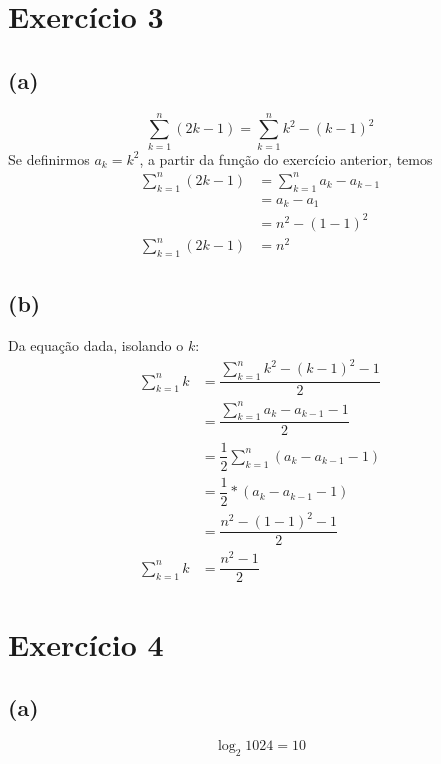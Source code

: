 \documentclass{article}
\begin{document}
\section{Exercício 3}
\subsection*{(a)}
\begin{equation}
	\sum\limits_{k=1}^{n}(2k - 1) =  \sum\limits_{k=1}^{n}k^2 - (k - 1)^2
\end{equation}
	Se definirmos $a_k = k^2$, a partir da função do exercício anterior, temos
\begin{equation}
\begin{split}
	\sum\limits_{k=1}^{n}(2k - 1) & =  \sum\limits_{k=1}^{n}a_k - a_{k-1}\\
	& =  a_k - a_1 \\
	& = n^2 - (1 - 1)^2 \\
	\sum\limits_{k=1}^{n}(2k - 1) & = n^2 
\end{split}
\end{equation}

\subsection*{(b)}
	Da equação dada, isolando o $k$:
\begin{equation}
\begin{split}
	\sum\limits_{k=1}^{n}k & =  \dfrac{\sum\limits_{k=1}^{n}k^2 - (k - 1)^2 - 1}{2}\\
	& = \dfrac{\sum\limits_{k=1}^{n}a_k - a_{k - 1} - 1}{2}\\
	& = \dfrac{1}{2}\sum\limits_{k=1}^{n}(a_k - a_{k - 1} - 1)\\
	& = \dfrac{1}{2} * (a_k - a_{k-1} - 1) \\
	& = \dfrac{n^2 - (1 - 1)^2 - 1}{2} \\
	\sum\limits_{k=1}^{n}k & = \dfrac{n^2 - 1}{2}
\end{split}
\end{equation}


\section{Exercício 4}
\subsection*{(a)}
\begin{equation}
	\log_2 1024 = 10
\end{equation}
\end{document}
